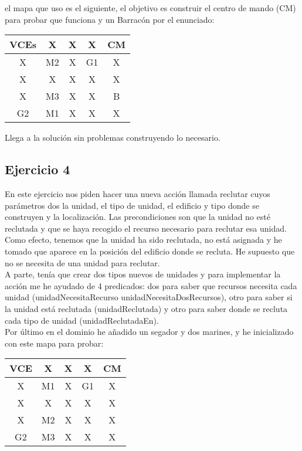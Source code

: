 \documentclass[a4paper,11pt]{article}
\begin{document}
el mapa que uso es el siguiente, el objetivo es construir el centro de mando (CM) para probar que funciona y un Barracón por el enunciado:
\begin{table}[h]
\begin{tabular}{|c|c|c|c|c|}
\hline
VCEs & X  & X & X  & CM  \\ \hline
X    & M2 & X & G1 & X   \\ \hline
X    & X  & X & X  & X   \\ \hline
X    & M3 & X & X  & B   \\ \hline
G2   & M1 & X & X  & X   \\ \hline
\end{tabular}
\end{table}

Llega a la solución sin problemas construyendo lo necesario.


\subsection{Ejercicio 4}

En este ejercicio nos piden hacer una nueva acción llamada reclutar cuyos parámetros dos la unidad, el tipo de unidad, el edificio y tipo donde se construyen y la localización. Las precondiciones son que la unidad no esté reclutada y que se haya recogido el recurso necesario para reclutar esa unidad. Como efecto, tenemos que la unidad ha sido reclutada, no está asignada y he tomado que aparece en la posición del edificio donde se recluta. He supuesto que no se necesita de una unidad para reclutar.\\

A parte, tenía que crear dos tipos nuevos de unidades y para implementar la acción me he ayudado de 4 predicados: dos para saber que recursos necesita cada unidad (unidadNecesitaRecurso unidadNecesitaDosRecursos), otro para saber si la unidad está reclutada (unidadReclutada) y otro para saber donde se recluta cada tipo de unidad (unidadReclutadaEn).\\

Por último en el dominio he añadido un segador y dos marines, y he inicializado con este mapa para probar:

\begin{table}[h]
\begin{tabular}{|c|c|c|c|c|}
\hline
VCE  & X  & X & X  & CM  \\ \hline
X    & M1 & X & G1 & X   \\ \hline
X    & X  & X & X  & X   \\ \hline
X    & M2 & X & X  & X   \\ \hline
G2   & M3 & X & X  & X   \\ \hline
\end{tabular}
\end{table}
\end{document}
